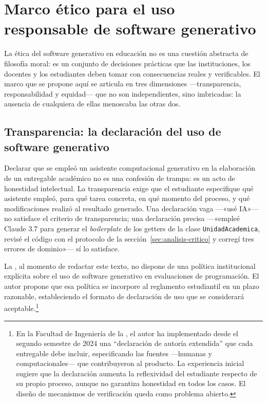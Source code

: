 \section{Marco ético para el uso responsable de software generativo}
\label{sec:marco-etico}

\noindent
La ética del software generativo en educación no es una cuestión abstracta
de filosofía moral: es un conjunto de decisiones prácticas que las instituciones,
los docentes y los estudiantes deben tomar con consecuencias reales y verificables.
El marco que se propone aquí se articula en tres dimensiones ---transparencia,
responsabilidad y equidad--- que no son independientes, sino imbricadas: la
ausencia de cualquiera de ellas menoscaba las otras dos.

\subsection{Transparencia: la declaración del uso de software generativo}
\label{subsec:transparencia}

Declarar que se empleó un asistente computacional generativo en la elaboración
de un entregable académico no es una confesión de trampa: es un acto de honestidad
intelectual. La transparencia exige que el estudiante especifique qué asistente
empleó, para qué tarea concreta, en qué momento del proceso, y qué modificaciones
realizó al resultado generado. Una declaración vaga ---«usé IA»--- no satisface
el criterio de transparencia; una declaración precisa ---«empleé Claude 3.7 para
generar el \textit{boilerplate} de los getters de la clase \texttt{UnidadAcademica},
revisé el código con el protocolo de la sección~\ref{sec:analisis-critico} y
corregí tres errores de dominio»--- sí lo satisface.

La \ud, al momento de redactar este texto, no dispone de una política institucional
explícita sobre el uso de software generativo en evaluaciones de programación.
El autor propone que esa política se incorpore al reglamento estudiantil en un
plazo razonable, estableciendo el formato de declaración de uso que se considerará
aceptable.\footnote{En la Facultad de Ingeniería de la \ud, el autor ha implementado
desde el segundo semestre de 2024 una ``declaración de autoría extendida'' que cada
entregable debe incluir, especificando las fuentes ---humanas y computacionales---
que contribuyeron al producto. La experiencia inicial sugiere que la declaración
aumenta la reflexividad del estudiante respecto de su propio proceso, aunque no
garantiza honestidad en todos los casos. El diseño de mecanismos de verificación
queda como problema abierto.}

